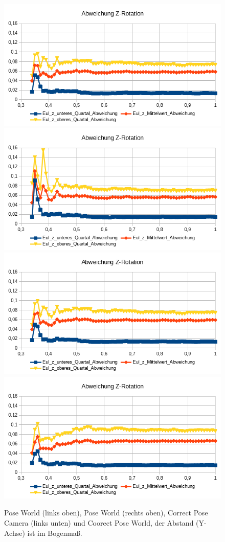 \begin{figure}
	\centering
	\includegraphics[width=0.45\linewidth]{tabelle/Z_Rot_PC}
	\includegraphics[width=0.45\linewidth]{tabelle/Z_Rot_PW}
	\includegraphics[width=0.45\linewidth]{tabelle/Z_Rot_CPC}
	\includegraphics[width=0.45\linewidth]{tabelle/Z_Rot_CPW}
	\caption{Pose World (links oben), Pose World (rechts oben), Correct Pose Camera (links unten) und Coorect Pose World, der Abstand (Y-Achse) ist im Bogenmaß.}
	\label{img_Z_Pot}
\end{figure}
